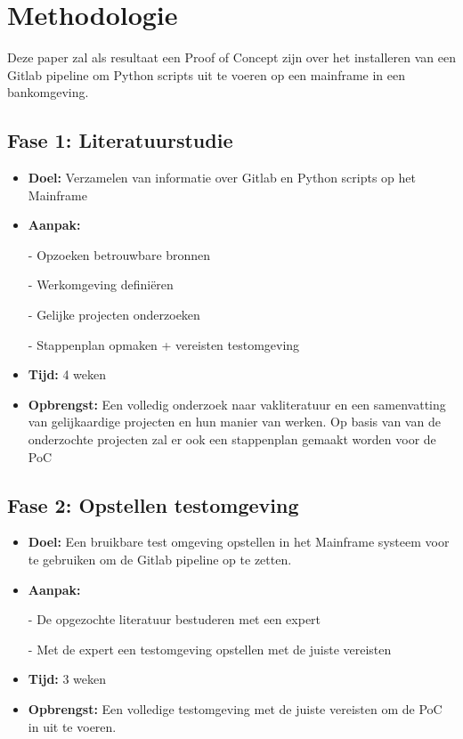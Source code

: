 

\section{Methodologie}%
\label{sec:methodologie}
Deze paper zal als resultaat een Proof of Concept zijn over het installeren van een Gitlab pipeline om Python scripts uit te voeren op een mainframe in een bankomgeving. 

\subsection{Fase 1: Literatuurstudie}
\begin{itemize}
    \item \textbf{Doel:}
          Verzamelen van informatie over Gitlab en Python scripts op het Mainframe
    \item \textbf{Aanpak:}
          \item[-] Opzoeken betrouwbare bronnen
          \item[-] Werkomgeving definiëren
          \item[-] Gelijke projecten onderzoeken
          \item[-] Stappenplan opmaken + vereisten testomgeving
          
     \item \textbf{Tijd:} 4 weken
     \item \textbf{Opbrengst:}
           Een volledig onderzoek naar vakliteratuur en een samenvatting van gelijkaardige projecten en hun manier van werken. Op basis van van de onderzochte projecten zal er ook een stappenplan gemaakt worden voor de PoC  
\end{itemize}


\subsection{Fase 2: Opstellen testomgeving}
\begin{itemize}
    \item \textbf{Doel:}
    Een bruikbare test omgeving opstellen in het Mainframe systeem voor te gebruiken om de Gitlab pipeline op te zetten.
    \item \textbf{Aanpak:}
    \item[-] De opgezochte literatuur bestuderen met een expert
    \item[-] Met de expert een testomgeving opstellen met de juiste vereisten
    
    \item \textbf{Tijd:} 3 weken
    \item \textbf{Opbrengst:}
    Een volledige testomgeving met de juiste vereisten om de PoC in uit te voeren.
\end{itemize}


